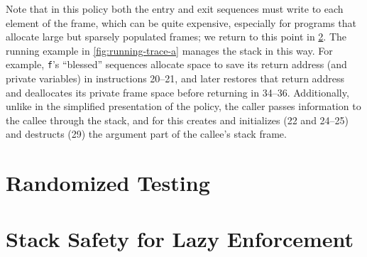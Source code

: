 \documentclass[acmsmall,review,anonymous]{acmart}\settopmatter{printfolios=true,printccs=false,printacmref=false}
\begin{document}
Note that in this policy both the entry and exit sequences
must write to each element of
the frame, which can be quite expensive, especially for programs that
allocate large but sparsely populated frames; we return to this point
in \cref{sec:lazy}.
%
The running example in \cref{fig:running-trace-a} manages the stack in this way.
For example, {\tt f}'s ``blessed'' sequences allocate space to save its return
address (and private variables) in instructions 20--21, and later restores that
return address and deallocates its private frame space before returning in
34--36. Additionally, unlike in the simplified presentation of the policy, the
caller passes information to the callee through the stack, and for this creates
and initializes (22 and 24--25) and destructs (29) the argument part of the
callee's stack frame.
%



\section{Randomized Testing}

\section{Stack Safety for Lazy Enforcement}
\label{sec:lazy}
\end{document}
